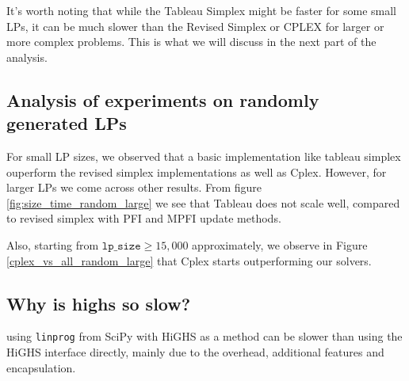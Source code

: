 It's worth noting that while the Tableau Simplex might be faster for some small LPs, 
it can be 
much slower than the Revised Simplex or CPLEX for larger or more complex problems. 
This is what we will discuss in  the next part of the analysis.

\subsection{Analysis of experiments on randomly generated LPs}
For small LP sizes, we observed that a basic implementation like tableau simplex
ouperform the revised simplex implementations as well as Cplex. However, for
larger LPs we come across other results. 
From figure \ref{fig:size_time_random_large} we see that Tableau does not scale well,
compared to revised simplex with PFI and MPFI update methods.

Also, starting from $\texttt{lp\_size} \geq 15,000$ approximately, we observe in Figure
\ref{cplex_vs_all_random_large} that Cplex starts outperforming our solvers.

\subsection{Why is highs so slow?}
using \texttt{linprog} from SciPy with HiGHS as a method can be 
slower than using the HiGHS interface directly, mainly due to the overhead, 
additional features and encapsulation.

